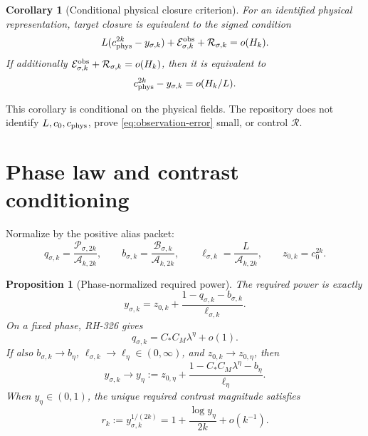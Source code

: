 \documentclass[11pt]{article}
\newtheorem{corollary}[theorem]{Corollary}
\newtheorem{proposition}[theorem]{Proposition}
\theoremstyle{remark}
\newcommand{\cA}{\mathcal A}
\newcommand{\cB}{\mathcal B}
\newcommand{\cE}{\mathcal E}
\newcommand{\cP}{\mathcal P}
\newcommand{\cR}{\mathcal R}
\begin{document}
\begin{corollary}[Conditional physical closure criterion]
\label{cor:closure}
For an identified physical representation, target closure is equivalent to
the signed condition
\begin{equation}
 L(c_{\rm phys}^{2k}-y_{\sigma,k})
 +\cE_{\sigma,k}^{\rm obs}+\cR_{\sigma,k}=o(H_k).
 \label{eq:signed-closure}
\end{equation}
If additionally
$\cE_{\sigma,k}^{\rm obs}+\cR_{\sigma,k}=o(H_k)$, then it is equivalent to
\begin{equation}
 c_{\rm phys}^{2k}-y_{\sigma,k}=o(H_k/L).
 \label{eq:power-precision}
\end{equation}
\end{corollary}

This corollary is conditional on the physical fields.  The repository does
not identify $L,c_0,c_{\rm phys}$, prove \eqref{eq:observation-error} small,
or control $\cR$.

\section{Phase law and contrast conditioning}

Normalize by the positive alias packet:
\begin{equation}
 q_{\sigma,k}=\frac{\cP_{\sigma,2k}}{\cA_{k,2k}},
 \qquad
 b_{\sigma,k}=\frac{\cB_{\sigma,k}}{\cA_{k,2k}},
 \qquad
 \ell_{\sigma,k}=\frac{L}{\cA_{k,2k}},
 \qquad
 z_{0,k}=c_0^{2k}.
 \label{eq:normalized-data}
\end{equation}

\begin{proposition}[Phase-normalized required power]
\label{prop:phase-power}
The required power is exactly
\begin{equation}
 \boxed{
 y_{\sigma,k}
 =z_{0,k}+\frac{1-q_{\sigma,k}-b_{\sigma,k}}
                    {\ell_{\sigma,k}}.}
 \label{eq:normalized-power}
\end{equation}
On a fixed phase, RH-326 gives
\begin{equation}
 q_{\sigma,k}=C_*C_M\lambda^\eta+o(1).
 \label{eq:phase-ratio}
\end{equation}
If also
$b_{\sigma,k}\to b_\eta$,
$\ell_{\sigma,k}\to\ell_\eta\in(0,\infty)$, and
$z_{0,k}\to z_{0,\eta}$, then
\begin{equation}
 y_{\sigma,k}\longrightarrow
 y_\eta:=z_{0,\eta}
 +\frac{1-C_*C_M\lambda^\eta-b_\eta}{\ell_\eta}.
 \label{eq:phase-limit}
\end{equation}
When $y_\eta\in(0,1)$, the unique required contrast magnitude satisfies
\begin{equation}
 r_k:=y_{\sigma,k}^{1/(2k)}
 =1+\frac{\log y_\eta}{2k}+o(k^{-1}).
 \label{eq:unit-edge-law}
\end{equation}
\end{proposition}
\end{document}
